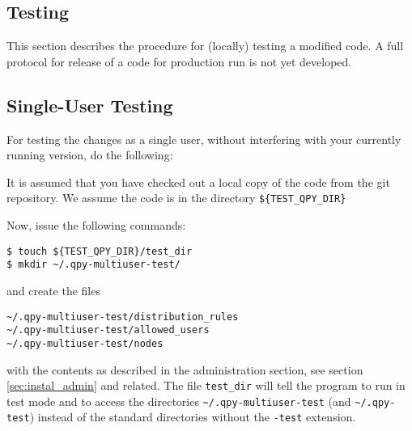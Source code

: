 \documentclass[a4paper,12pt]{article}
\begin{document}
\begin{center}
\end{center}

\linespread{1.5}


\subsection{Testing}

This section describes the procedure for (locally) testing a modified code. A full protocol for release of a code for production run is not yet developed.

\subsection{Single-User Testing}

For testing the changes as a single user, without interfering with your currently running \qpy{} version, do the following:

It is assumed that you have checked out a local copy of the \qpy{} code from the git repository. We assume the code is in the directory \verb+${TEST_QPY_DIR}+

Now, issue the following commands:
\begin{lstlisting}[style=BashStyle]
$ touch ${TEST_QPY_DIR}/test_dir
$ mkdir ~/.qpy-multiuser-test/
\end{lstlisting}
and create the files
\begin{verbatim}
~/.qpy-multiuser-test/distribution_rules
~/.qpy-multiuser-test/allowed_users
~/.qpy-multiuser-test/nodes
\end{verbatim}
with the contents as described in the administration section, see section \ref{sec:instal_admin} and related. The file \verb+test_dir+ will tell the program to run in test mode and to access the directories \verb+~/.qpy-multiuser-test+ (and \verb+~/.qpy-test+) instead of the standard directories without the \verb+-test+ extension.
\end{document}
